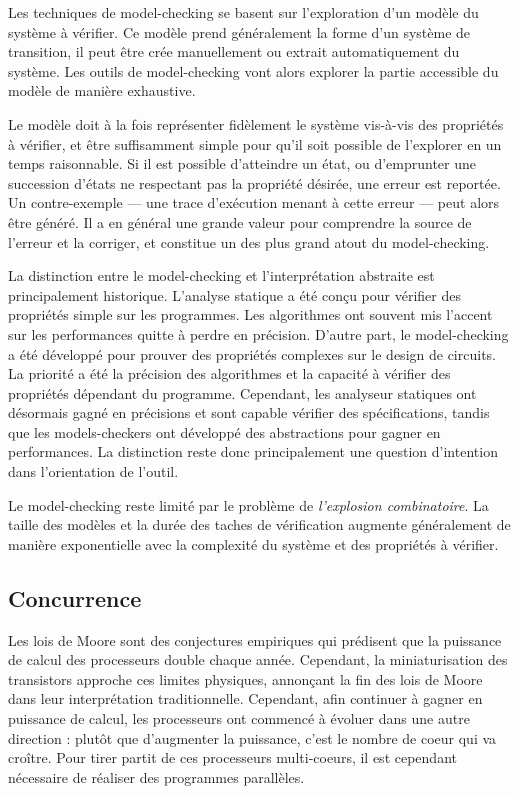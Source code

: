 Les techniques de model-checking se basent sur l'exploration d'un modèle
du système à vérifier. Ce modèle prend généralement la forme d'un
système de transition, il peut être crée manuellement ou extrait
automatiquement du système. Les outils de model-checking vont alors
explorer la partie accessible du modèle de manière exhaustive.

Le modèle doit à la fois représenter fidèlement le système vis-à-vis des
propriétés à vérifier, et être suffisamment simple pour qu'il soit
possible de l'explorer en un temps raisonnable. Si il est possible
d'atteindre un état, ou d'emprunter une succession d'états ne respectant
pas la propriété désirée, une erreur est reportée. Un contre-exemple ---
une trace d'exécution menant à cette erreur --- peut alors être généré.
Il a en général une grande valeur pour comprendre la source de l'erreur
et la corriger, et constitue un des plus grand atout du model-checking.

La distinction entre le model-checking et l'interprétation abstraite est
principalement historique. L'analyse statique a été conçu pour vérifier
des propriétés simple sur les programmes. Les algorithmes ont souvent
mis l'accent sur les performances quitte à perdre en précision. D'autre
part, le model-checking a été développé pour prouver des propriétés
complexes sur le design de circuits. La priorité a été la précision des
algorithmes et la capacité à vérifier des propriétés dépendant du
programme. Cependant, les analyseur statiques ont désormais gagné en
précisions et sont capable vérifier des spécifications, tandis que les
models-checkers ont développé des abstractions pour gagner en
performances. La distinction reste donc principalement une question
d'intention dans l'orientation de l'outil.

Le model-checking reste limité par le problème de \emph{l'explosion
combinatoire}. La taille des modèles et la durée des taches de
vérification augmente généralement de manière exponentielle avec la
complexité du système et des propriétés à vérifier.

\subsection{Concurrence}

Les lois de Moore sont des conjectures empiriques qui prédisent que la
puissance de calcul des processeurs double chaque année. Cependant, la
miniaturisation des transistors approche ces limites physiques,
annonçant la fin des lois de Moore dans leur interprétation
traditionnelle. Cependant, afin continuer à gagner en puissance de
calcul, les processeurs ont commencé à évoluer dans une autre direction
: plutôt que d'augmenter la puissance, c'est le nombre de coeur qui va
croître. Pour tirer partit de ces processeurs multi-coeurs, il est
cependant nécessaire de réaliser des programmes parallèles.

